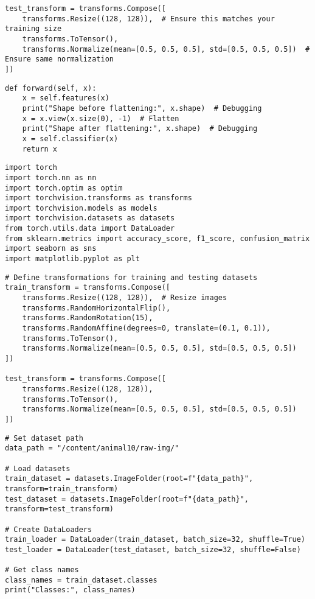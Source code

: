 \begin{verbatim}
test_transform = transforms.Compose([
    transforms.Resize((128, 128)),  # Ensure this matches your training size
    transforms.ToTensor(),
    transforms.Normalize(mean=[0.5, 0.5, 0.5], std=[0.5, 0.5, 0.5])  # Ensure same normalization
])

\end{verbatim}

\begin{verbatim}
def forward(self, x):
    x = self.features(x)
    print("Shape before flattening:", x.shape)  # Debugging
    x = x.view(x.size(0), -1)  # Flatten
    print("Shape after flattening:", x.shape)  # Debugging
    x = self.classifier(x)
    return x

\end{verbatim}

\begin{verbatim}
import torch
import torch.nn as nn
import torch.optim as optim
import torchvision.transforms as transforms
import torchvision.models as models
import torchvision.datasets as datasets
from torch.utils.data import DataLoader
from sklearn.metrics import accuracy_score, f1_score, confusion_matrix
import seaborn as sns
import matplotlib.pyplot as plt

\end{verbatim}

\begin{verbatim}
# Define transformations for training and testing datasets
train_transform = transforms.Compose([
    transforms.Resize((128, 128)),  # Resize images
    transforms.RandomHorizontalFlip(),
    transforms.RandomRotation(15),
    transforms.RandomAffine(degrees=0, translate=(0.1, 0.1)),
    transforms.ToTensor(),
    transforms.Normalize(mean=[0.5, 0.5, 0.5], std=[0.5, 0.5, 0.5])
])

test_transform = transforms.Compose([
    transforms.Resize((128, 128)),
    transforms.ToTensor(),
    transforms.Normalize(mean=[0.5, 0.5, 0.5], std=[0.5, 0.5, 0.5])
])

\end{verbatim}

\begin{verbatim}
# Set dataset path
data_path = "/content/animal10/raw-img/"

# Load datasets
train_dataset = datasets.ImageFolder(root=f"{data_path}", transform=train_transform)
test_dataset = datasets.ImageFolder(root=f"{data_path}", transform=test_transform)

# Create DataLoaders
train_loader = DataLoader(train_dataset, batch_size=32, shuffle=True)
test_loader = DataLoader(test_dataset, batch_size=32, shuffle=False)

# Get class names
class_names = train_dataset.classes
print("Classes:", class_names)

\end{verbatim}

